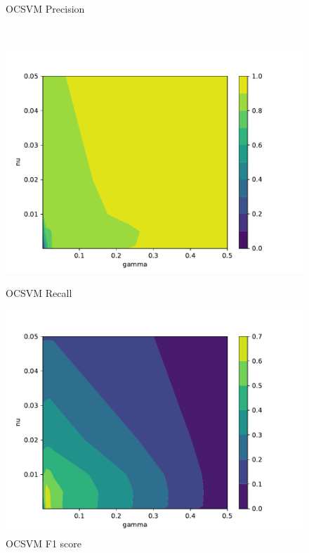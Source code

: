 \begin{figure}[p]
\begin{minipage}[t]{0.5\textwidth}
        \caption{OCSVM Precision}
    \end{minipage}
    \\
    \begin{minipage}[t]{0.5\textwidth}
        \vspace{0pt}
        \includegraphics[width=\textwidth]{images/ocsvm-recall.pdf}
        \caption{OCSVM Recall}
    \end{minipage}
    \hfill
    \begin{minipage}[t]{0.5\textwidth}
        \vspace{0pt}
        \includegraphics[width=\textwidth]{images/ocsvm-f1.pdf}
        \caption{OCSVM F1 score}
    \end{minipage}
\end{figure}


